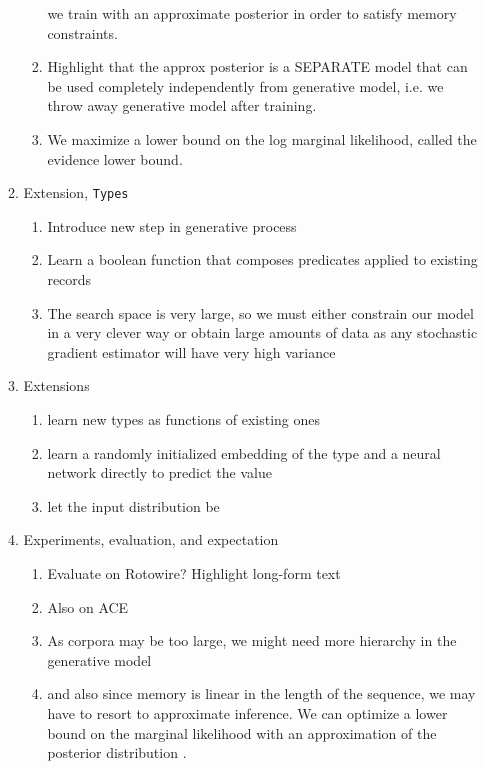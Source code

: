 \documentclass[11pt]{article}
\begin{document}
\begin{enumerate}
\begin{enumerate}
\begin{enumerate}
            we train with an approximate posterior in order to satisfy memory constraints.
        \item Highlight that the approx posterior is a SEPARATE model
            that can be used completely independently from generative model,
            i.e. we throw away generative model after training.
        \item We maximize a lower bound on the log marginal likelihood,
            called the evidence lower bound.
        \end{enumerate}
    \item Extension, \texttt{Types}
        \begin{enumerate}
        \item Introduce new step in generative process
        \item Learn a boolean function that composes predicates applied to existing
            records
        \item The search space is very large, so we must either constrain our model 
            in a very clever way or obtain 
            large amounts of data as any stochastic gradient estimator will have very high variance
        \end{enumerate}
    \item Extensions
        \begin{enumerate}
        \item learn new types as functions of existing ones
        \item learn a randomly initialized embedding of the type
            and a neural network directly to predict the value
        \item let the input distribution be 
        \end{enumerate}
    \item Experiments, evaluation, and expectation
        \begin{enumerate}
        \item Evaluate on Rotowire? Highlight long-form text
        \item Also on ACE
        \item As corpora may be too large, we might need more hierarchy in the generative model
        \item and also since memory is linear in the length of the sequence, we may have
            to resort to approximate inference. We can optimize a lower bound
            on the marginal likelihood with an approximation of the
            posterior distribution \citep{deng2018attn}.

\end{enumerate}
\end{enumerate}
\end{enumerate}
\end{document}
